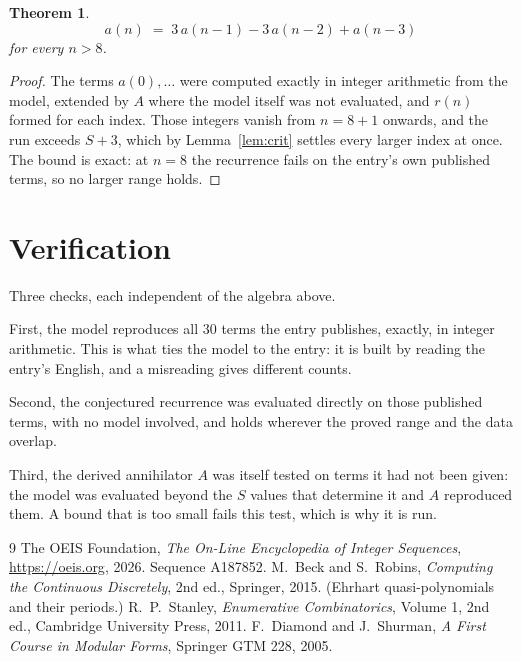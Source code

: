 \documentclass[11pt,a4paper]{article}
\theoremstyle{plain}
\newtheorem{theorem}{Theorem}
\theoremstyle{definition}
\begin{document}
\begin{theorem}
\[
a(n)\;=\;3\,a(n-1) - 3\,a(n-2) + a(n-3)
\]
for every $n>8$.
\end{theorem}

\begin{proof}
The terms $a(0),\dots$ were computed exactly in integer arithmetic from the model, extended by
$A$ where the model itself was not evaluated, and $r(n)$ formed for each index. Those integers
vanish from $n=8+1$ onwards, and the run exceeds $S+3$, which by
Lemma~\ref{lem:crit} settles every larger index at once. The bound is exact: at $n=8$ the recurrence fails on the entry's own published terms, so no larger range holds.
\end{proof}

\section{Verification}

Three checks, each independent of the algebra above.

First, the model reproduces all $30$ terms the entry publishes, exactly, in integer
arithmetic. This is what ties the model to the entry: it is built by reading the entry's
English, and a misreading gives different counts.

Second, the conjectured recurrence was evaluated directly on those published terms, with no
model involved, and holds wherever the proved range and the data overlap.

Third, the derived annihilator $A$ was itself tested on terms it had not been given: the model
was evaluated beyond the $S$ values that determine it and $A$ reproduced them. A bound that is
too small fails this test, which is why it is run.

\begin{thebibliography}{9}
 The OEIS Foundation, \emph{The On-Line Encyclopedia of Integer
Sequences}, \url{https://oeis.org}, 2026. Sequence A187852.
 M.~Beck and S.~Robins, \emph{Computing the Continuous Discretely},
2nd ed., Springer, 2015. (Ehrhart quasi-polynomials and their periods.)
 R.~P.~Stanley, \emph{Enumerative Combinatorics}, Volume 1, 2nd ed.,
Cambridge University Press, 2011.
 F.~Diamond and J.~Shurman, \emph{A First Course in Modular Forms},
Springer GTM 228, 2005.
\end{thebibliography}
\end{document}
